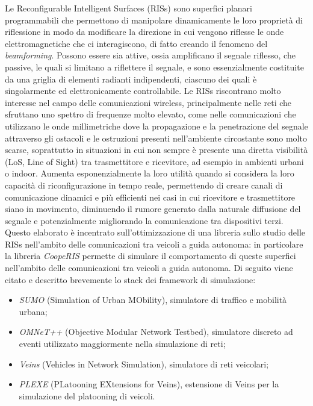Le Reconfigurable Intelligent Surfaces (RISs) sono superfici planari programmabili
che permettono di manipolare dinamicamente le loro proprietà di riflessione in modo
da modificare la direzione in cui vengono riflesse le onde elettromagnetiche che
ci interagiscono, di fatto creando il fenomeno del \textit{beamforming}. Possono
essere sia attive, ossia amplificano il segnale riflesso, che passive, le quali si
limitano a riflettere il segnale, e sono essenzialmente costituite da una
griglia di elementi radianti indipendenti, ciascuno dei quali è singolarmente ed
elettronicamente controllabile. Le RISs riscontrano molto interesse nel campo
delle comunicazioni wireless, principalmente nelle reti che sfruttano uno spettro
di frequenze molto elevato, come nelle comunicazioni che utilizzano le onde
millimetriche dove la propagazione e la penetrazione del segnale attraverso gli
ostacoli e le ostruzioni presenti nell'ambiente circostante sono molto scarse, soprattutto
in situazioni in cui non sempre è presente una diretta visibilità (LoS, Line of Sight)
tra trasmettitore e ricevitore, ad esempio in ambienti urbani o indoor. Aumenta
esponenzialmente la loro utilità quando si considera la loro capacità di
riconfigurazione in tempo reale, permettendo di creare canali di comunicazione dinamici
e più efficienti nei casi in cui ricevitore e trasmettitore siano in movimento,
diminuendo il rumore generato dalla naturale diffusione del segnale e
potenzialmente migliorando la comunicazione tra dispositivi terzi. Questo elaborato
è incentrato sull'ottimizzazione di una libreria sullo studio delle RISs nell'ambito
delle comunicazioni tra veicoli a guida autonoma: in particolare la libreria
\textit{CoopeRIS}\cite{cooperis} permette di simulare il comportamento di queste
superfici nell'ambito delle comunicazioni tra veicoli a guida autonoma. Di seguito
viene citato e descritto brevemente lo stack dei framework di simulazione:
\begin{itemize}
  \item \textit{SUMO} (Simulation of Urban MObility), simulatore di traffico e mobilità
    urbana\cite{sumo};

  \item \textit{OMNeT++} (Objective Modular Network Testbed), simulatore discreto
    ad eventi utilizzato maggiormente nella simulazione di reti\cite{omnetpp};

  \item \textit{Veins} (Vehicles in Network Simulation), simulatore di reti veicolari\cite{veins};

  \item \textit{PLEXE} (PLatooning EXtensions for Veins), estensione di Veins per
    la simulazione del platooning di veicoli\cite{plexe}.
\end{itemize}

